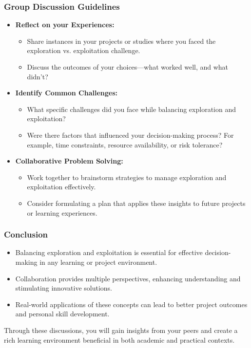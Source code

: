 \documentclass[aspectratio=169]{beamer}
\begin{document}
\begin{frame}[fragile]
    \frametitle{Group Discussion Guidelines}
    \begin{itemize}
        \item \textbf{Reflect on your Experiences:}
        \begin{itemize}
            \item Share instances in your projects or studies where you faced the exploration vs. exploitation challenge.
            \item Discuss the outcomes of your choices—what worked well, and what didn’t?
        \end{itemize}

        \item \textbf{Identify Common Challenges:}
        \begin{itemize}
            \item What specific challenges did you face while balancing exploration and exploitation?
            \item Were there factors that influenced your decision-making process? For example, time constraints, resource availability, or risk tolerance?
        \end{itemize}

        \item \textbf{Collaborative Problem Solving:}
        \begin{itemize}
            \item Work together to brainstorm strategies to manage exploration and exploitation effectively.
            \item Consider formulating a plan that applies these insights to future projects or learning experiences.
        \end{itemize}
    \end{itemize}
\end{frame}

\begin{frame}[fragile]
    \frametitle{Conclusion}
    \begin{itemize}
        \item Balancing exploration and exploitation is essential for effective decision-making in any learning or project environment.
        \item Collaboration provides multiple perspectives, enhancing understanding and stimulating innovative solutions.
        \item Real-world applications of these concepts can lead to better project outcomes and personal skill development.
    \end{itemize}
    
    Through these discussions, you will gain insights from your peers and create a rich learning environment beneficial in both academic and practical contexts.
\end{frame}
\end{document}
